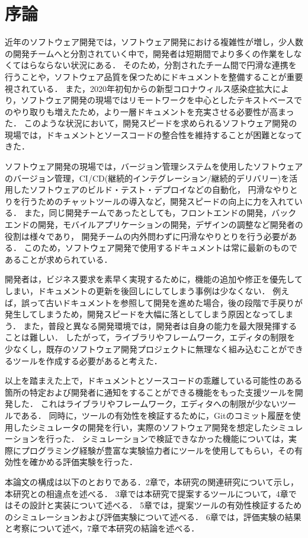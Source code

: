 \chapter{序論}
近年のソフトウェア開発では，ソフトウェア開発における複雑性が増し，少人数の開発チームへと分割されていく中で，開発者は短期間でより多くの作業をしなくてはらならない状況にある．
そのため，分割されたチーム間で円滑な連携を行うことや，ソフトウェア品質を保つためにドキュメントを整備することが重要視されている\cite{maintenance}．
また，2020年初旬からの新型コロナウィルス感染症拡大により，ソフトウェア開発の現場ではリモートワークを中心としたテキストベースでのやり取りも増えたため，より一層ドキュメントを充実させる必要性が高まった．
このような状況において，開発スピードを求められるソフトウェア開発の現場では，ドキュメントとソースコードの整合性を維持することが困難となってきた．

ソフトウェア開発の現場では，バージョン管理システムを使用したソフトウェアのバージョン管理，CI/CD(継続的インテグレーション/継続的デリバリー)を活用したソフトウェアのビルド・テスト・デプロイなどの自動化，
円滑なやりとりを行うためのチャットツールの導入など，開発スピードの向上に力を入れている．
また，同じ開発チームであったとしても，フロントエンドの開発，バックエンドの開発，モバイルアプリケーションの開発，デザインの調整など開発者の役割は様々であり，
開発チームの内外問わずに円滑なやりとりを行う必要がある．
このため，ソフトウェア開発で使用するドキュメントは常に最新のものであることが求められている．

開発者は，ビジネス要求を素早く実現するために，機能の追加や修正を優先してしまい，ドキュメントの更新を後回しにしてしまう事例は少なくない．
例えば，誤って古いドキュメントを参照して開発を進めた場合，後の段階で手戻りが発生してしまうため，開発スピードを大幅に落としてしまう原因となってしまう．
また，普段と異なる開発環境では，開発者は自身の能力を最大限発揮することは難しい．
したがって，ライブラリやフレームワーク，エディタの制限を少なくし，既存のソフトウェア開発プロジェクトに無理なく組み込むことができるツールを作成する必要があると考えた．

以上を踏まえた上で，ドキュメントとソースコードの乖離している可能性のある箇所の特定および開発者に通知をすることができる機能をもった支援ツールを開発した．
これはライブラリやフレームワーク，エディタへの制限が少ないツールである．
同時に，ツールの有効性を検証するために，Gitのコミット履歴を使用したシミュレータの開発を行い，実際のソフトウェア開発を想定したシミュレーションを行った．
シミュレーションで検証できなかった機能については，実際にプログラミング経験が豊富な実験協力者にツールを使用してもらい，その有効性を確かめる評価実験を行った．

本論文の構成は以下のとおりである．2章で，本研究の関連研究について示し，本研究との相違点を述べる．
3章では本研究で提案するツールについて，4章ではその設計と実装について述べる．
5章では，提案ツールの有効性検証するためのシミュレーションおよび評価実験について述べる．
6章では，評価実験の結果と考察について述べ，7章で本研究の結論を述べる．